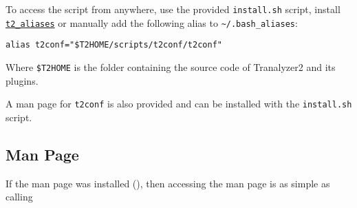 To access the script from anywhere, use the provided {\tt install.sh} script, install \hyperref[s:aliases]{\tt t2\_aliases} or manually add the following alias to {\tt \textasciitilde{}/.bash\_aliases}:
\begin{center}
{\tt alias t2conf="\$T2HOME/scripts/t2conf/t2conf"}
\end{center}
Where {\tt \$T2HOME} is the folder containing the source code of Tranalyzer2 and its plugins.

A man page for {\tt t2conf} is also provided and can be installed with the {\tt install.sh} script.
%
%
%
%
%
%
%
%
%
%
%
%
%

\subsection{Man Page}
If the man page was installed (), then accessing the man page is as simple as calling

